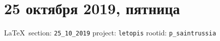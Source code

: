  
 
\section{25 октября 2019, пятница}
\label{sec:25_10_2019}
  
\vspace{0.5cm}
 {\ifDEBUG\small\LaTeX~section: \verb|25_10_2019| project: \verb|letopis| rootid: \verb|p_saintrussia| \fi}
\vspace{0.5cm}

  
